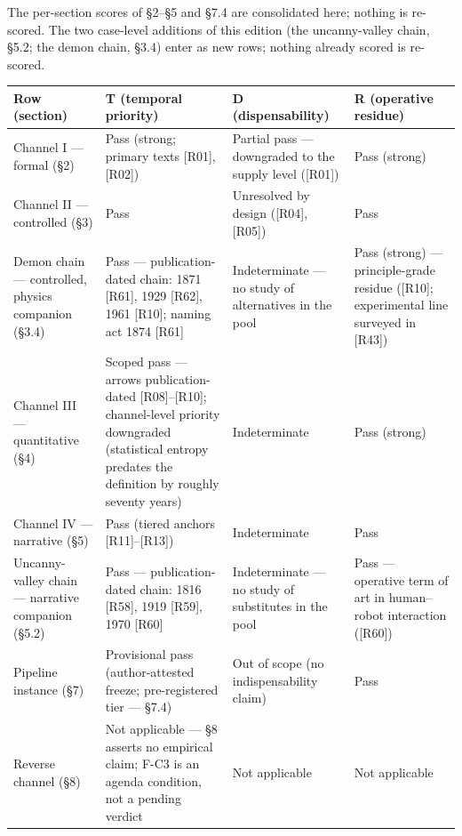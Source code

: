 \documentclass[11pt,a4paper]{article}
\begin{document}
The per-section scores of §2–§5 and §7.4 are consolidated here; nothing is re-scored. The two case-level additions of this edition (the uncanny-valley chain, §5.2; the demon chain, §3.4) enter as new rows; nothing already scored is re-scored.

\begin{table}[htbp]
\centering
\footnotesize
\setlength{\tabcolsep}{3.5pt}
\renewcommand{\arraystretch}{1.18}
\begin{tabularx}{0.985\textwidth}{@{}>{\raggedright\arraybackslash}p{}>{\raggedright\arraybackslash}X>{\raggedright\arraybackslash}X>{\raggedright\arraybackslash}X@{}}
\toprule
\textbf{Row (section)} & \textbf{T (temporal priority)} & \textbf{D (dispensability)} & \textbf{R (operative residue)} \\
\midrule
Channel I — formal (§2) & Pass (strong; primary texts [R01], [R02]) & Partial pass — downgraded to the supply level ([R01]) & Pass (strong) \\
Channel II — controlled (§3) & Pass & Unresolved by design ([R04], [R05]) & Pass \\
Demon chain — controlled, physics companion (§3.4) & Pass — publication-dated chain: 1871 [R61], 1929 [R62], 1961 [R10]; naming act 1874 [R61] & Indeterminate — no study of alternatives in the pool & Pass (strong) — principle-grade residue ([R10]; experimental line surveyed in [R43]) \\
Channel III — quantitative (§4) & Scoped pass — arrows publication-dated [R08]–[R10]; channel-level priority downgraded (statistical entropy predates the definition by roughly seventy years) & Indeterminate & Pass (strong) \\
Channel IV — narrative (§5) & Pass (tiered anchors [R11]–[R13]) & Indeterminate & Pass \\
Uncanny-valley chain — narrative companion (§5.2) & Pass — publication-dated chain: 1816 [R58], 1919 [R59], 1970 [R60] & Indeterminate — no study of substitutes in the pool & Pass — operative term of art in human--robot interaction ([R60]) \\
Pipeline instance (§7) & Provisional pass (author-attested freeze; pre-registered tier — §7.4) & Out of scope (no indispensability claim) & Pass \\
Reverse channel (§8) & Not applicable — §8 asserts no empirical claim; F-C3 is an agenda condition, not a pending verdict & Not applicable & Not applicable \\
\bottomrule
\end{tabularx}
\end{table}
\end{document}
